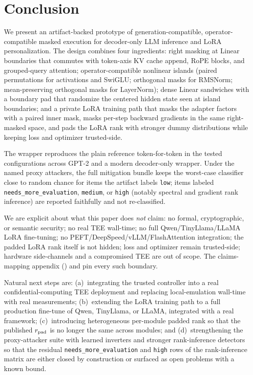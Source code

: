 \section{Conclusion}
\label{sec:conclusion}

We present an artifact-backed prototype of generation-compatible, operator-compatible masked execution for decoder-only LLM inference and LoRA personalization. The design combines four ingredients: right masking at Linear boundaries that commutes with token-axis KV cache append, RoPE blocks, and grouped-query attention; operator-compatible nonlinear islands (paired permutations for activations and SwiGLU; orthogonal masks for RMSNorm; mean-preserving orthogonal masks for LayerNorm); dense Linear sandwiches with a boundary pad that randomize the centered hidden state seen at island boundaries; and a private LoRA training path that masks the adapter factors with a paired inner mask, masks per-step backward gradients in the same right-masked space, and pads the LoRA rank with stronger dummy distributions while keeping loss and optimizer trusted-side.

The wrapper reproduces the plain reference token-for-token in the tested configurations across GPT-2 and a modern decoder-only wrapper. Under the named proxy attackers, the full mitigation bundle keeps the worst-case classifier close to random chance for items the artifact labels \texttt{low}; items labeled \texttt{needs\_more\_evaluation}, \texttt{medium}, or \texttt{high} (notably spectral and gradient rank inference) are reported faithfully and not re-classified.

We are explicit about what this paper does \emph{not} claim: no formal, cryptographic, or semantic security; no real TEE wall-time; no full Qwen/TinyLlama/LLaMA LoRA fine-tuning; no PEFT/DeepSpeed/vLLM/FlashAttention integration; the padded LoRA rank itself is not hidden; loss and optimizer remain trusted-side; hardware side-channels and a compromised TEE are out of scope. The claims-mapping appendix () and  pin every such boundary.

Natural next steps are: (a)~integrating the trusted controller into a real confidential-computing TEE deployment and replacing local-emulation wall-time with real measurements; (b)~extending the LoRA training path to a full production fine-tune of Qwen, TinyLlama, or LLaMA, integrated with a real framework; (c)~introducing heterogeneous per-module padded rank so that the published $r_{\mathrm{pad}}$ is no longer the same across modules; and (d)~strengthening the proxy-attacker suite with learned inverters and stronger rank-inference detectors so that the residual \texttt{needs\_more\_evaluation} and \texttt{high} rows of the rank-inference matrix are either closed by construction or surfaced as open problems with a known bound.
